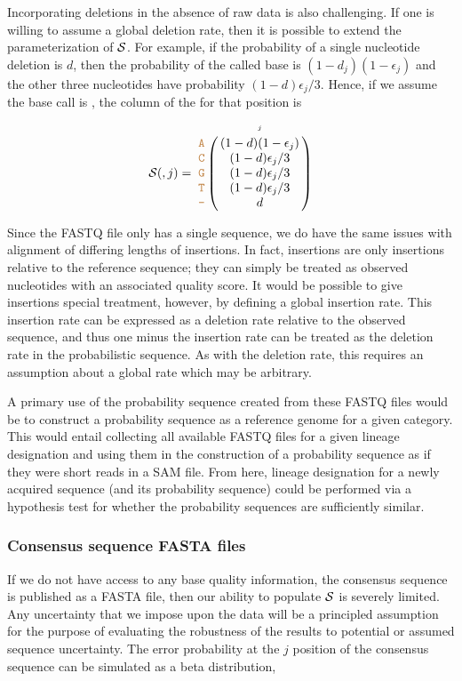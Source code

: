\documentclass[12pt]{article}
\begin{document}
Incorporating deletions in the absence of raw data is also challenging.
If one is willing to assume a global deletion rate, then it is possible to extend the parameterization of $\mathcal{S}$.
For example, if the probability of a single nucleotide deletion is $d$, then the probability of the called base is $(1-d_j)(1-\epsilon_j)$ and the other three nucleotides have probability $(1-d)\epsilon_j/3$.
Hence, if we assume the base call is , the column of the \nlps for that position is
\begin{equation}
\nps(,j) = 
\bordermatrix{
&\scriptscriptstyle{j}  \cr
\sq{A} & (1 - d)(1-\epsilon_j) \cr
\sq{C} & (1 - d)\epsilon_j/3 \cr
\sq{G} & (1 - d)\epsilon_j/3 \cr
\sq{T} & (1 - d)\epsilon_j/3 \cr
\sq{-} & d \cr
}
\label{eq:deletion}
\end{equation}

Since the FASTQ file only has a single sequence, we do have the same issues with alignment of differing lengths of insertions.
In fact, insertions are only insertions relative to the reference sequence; they can simply be treated as observed nucleotides with an associated quality score.
It would be possible to give insertions special treatment, however, by defining a global insertion rate.
This insertion rate can be expressed as a deletion rate relative to the observed sequence, and thus one minus the insertion rate can be treated as the deletion rate in the probabilistic sequence.
As with the deletion rate, this requires an assumption about a global rate which may be arbitrary.


A primary use of the probability sequence created from these FASTQ files would be to construct a probability sequence as a reference genome for a given category.
This would entail collecting all available FASTQ files for a given lineage designation and using them in the construction of a probability sequence as if they were short reads in a SAM file.
From here, lineage designation for a newly acquired sequence (and its probability sequence) could be performed via a hypothesis test for whether the probability sequences are sufficiently similar. 

\subsubsection{Consensus sequence FASTA files}
\label{sec:consensusfasta}

If we do not have access to any base quality information, \eg the consensus sequence is published as a FASTA file, then our ability to populate $\mathcal{S}$ is severely limited.
Any uncertainty that we impose upon the data will be a principled assumption for the purpose of evaluating the robustness of the results to potential or assumed sequence uncertainty.
The error probability at the $j$ position of the consensus sequence can be simulated as a beta distribution, \ie \vspace{-4mm}
\end{document}

